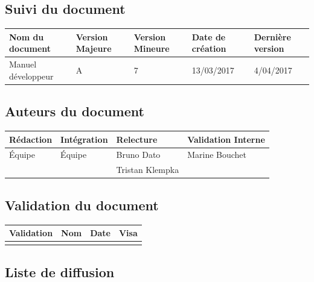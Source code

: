 \documentclass[10pt,a4paper]{article}
\begin{document}
\newpage


\subsection*{Suivi du document}

\begin{center}
    \begin{tabular}{| l | l | l | l | l |}
    \hline
     \rowcolor{gray} Nom du document & Version Majeure & Version Mineure & Date de création & Dernière version \\ \hline
    Manuel développeur & A & 7 & 13/03/2017 & 4/04/2017 \\ \hline
    \end{tabular}
\end{center}


\subsection*{Auteurs du document}

\begin{center}
    \begin{tabular}{| l | l | l | l |}
    \hline
    \rowcolor{gray} Rédaction & Intégration & Relecture & Validation Interne \\ \hline
    Équipe & Équipe & Bruno Dato & Marine Bouchet \\ 
     &  & Tristan Klempka & \\ \hline

    \end{tabular}
\end{center}

\subsection*{Validation du document}

\begin{center}
    \begin{tabular}{| l | l | l | l |}
    \hline
     \rowcolor{gray} Validation & Nom & Date & Visa \\ \hline
    & & & \\
     \hline
    \end{tabular}
\end{center}

\subsection*{Liste de diffusion}
\end{document}
